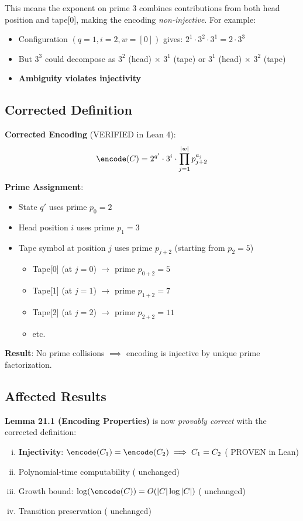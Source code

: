 This means the exponent on prime 3 combines contributions from both head position and tape[0], making the encoding \textit{non-injective}. For example:
\begin{itemize}
\item Configuration $(q=1, i=2, w=[0])$ gives: $2^1 \cdot 3^2 \cdot 3^1 = 2 \cdot 3^3$
\item But $3^3$ could decompose as $3^2$ (head) $\times$ $3^1$ (tape) or $3^1$ (head) $\times$ $3^2$ (tape)
\item \textbf{Ambiguity violates injectivity}
\end{itemize}

\subsection*{Corrected Definition}

\textbf{Corrected Encoding} (VERIFIED in Lean 4):
\begin{equation}
\encode(C) = 2^{q'} \cdot 3^{i} \cdot \prod_{j=1}^{|w|} p_{j+2}^{a_j}
\end{equation}

\textbf{Prime Assignment}:
\begin{itemize}
\item State $q'$ uses prime $p_0 = 2$
\item Head position $i$ uses prime $p_1 = 3$
\item Tape symbol at position $j$ uses prime $p_{j+2}$ (starting from $p_2 = 5$)
\begin{itemize}
    \item Tape[0] (at $j=0$) $\to$ prime $p_{0+2} = 5$
    \item Tape[1] (at $j=1$) $\to$ prime $p_{1+2} = 7$
    \item Tape[2] (at $j=2$) $\to$ prime $p_{2+2} = 11$
    \item etc.
\end{itemize}
\end{itemize}

\textbf{Result}: No prime collisions $\implies$ encoding is injective by unique prime factorization.

\subsection*{Affected Results}

\textbf{Lemma 21.1 (Encoding Properties)} is now \textit{provably correct} with the corrected definition:
\begin{enumerate}[(i)]
\item \textbf{Injectivity}: $\encode(C_1) = \encode(C_2) \implies C_1 = C_2$ \quad (\textcolor{green}{\checkmark} PROVEN in Lean)
\item Polynomial-time computability \quad (\textcolor{green}{\checkmark} unchanged)
\item Growth bound: $\log(\encode(C)) = O(|C| \log |C|)$ \quad (\textcolor{green}{\checkmark} unchanged)
\item Transition preservation \quad (\textcolor{green}{\checkmark} unchanged)
\end{enumerate}

